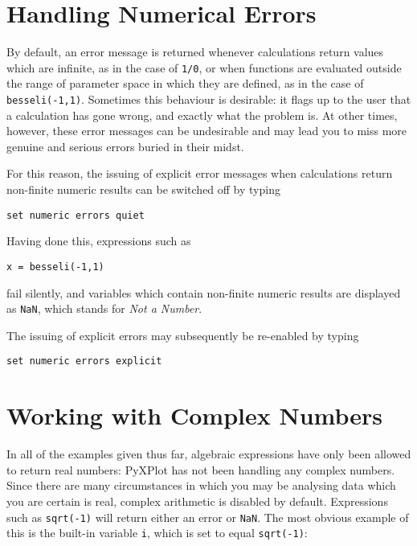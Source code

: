 \section{Handling Numerical Errors}
\label{sec:num_errs}

By default, an error message is returned whenever calculations return values
which are infinite, as in the case of {\tt 1/0}, or when functions are
evaluated outside the range of parameter space in which they are defined, as in
the case of {\tt besseli(-1,1)}.  Sometimes this behaviour is desirable: it
flags up to the user that a calculation has gone wrong, and exactly what the
problem is.  At other times, however, these error messages can be undesirable
and may lead you to miss more genuine and serious errors buried in their midst.

For this reason, the issuing of explicit error messages when calculations
return non-finite numeric results can be switched off by typing

\begin{verbatim}
set numeric errors quiet
\end{verbatim}

\noindent Having done this, expressions such as

\begin{verbatim}
x = besseli(-1,1)
\end{verbatim}

\noindent fail silently, and variables which contain non-finite numeric results
are displayed as {\tt NaN}, which stands for {\it Not a
Number}.

The issuing of explicit errors may subsequently be re-enabled by typing

\begin{verbatim}
set numeric errors explicit
\end{verbatim}

\section{Working with Complex Numbers}
\label{sec:complex_numbers}

In all of the examples given thus far, algebraic expressions have only been
allowed to return real numbers: PyXPlot has not been handling any complex
numbers. Since there are many circumstances in which you may be analysing data
which you are certain is real, complex arithmetic is disabled by default.
Expressions such as {\tt sqrt(-1)} will return either an error or {\tt NaN}.
The most obvious example of this is the built-in variable {\tt i}, which is set
to equal {\tt sqrt(-1)}:

